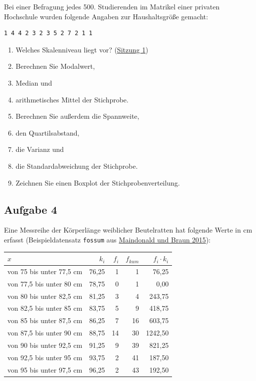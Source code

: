\documentclass[
  11pt,
  ngerman,
  a4paper,
]{report}
\providecommand{\tightlist}{%
  \setlength{\itemsep}{0pt}\setlength{\parskip}{0pt}}
\begin{document}
Bei einer Befragung jedes 500. Studierenden im Matrikel einer privaten Hochschule wurden folgende Angaben zur Haushaltsgröße gemacht:

\begin{verbatim}
1 4 4 2 3 2 3 5 2 7 2 1 1
\end{verbatim}

\begin{enumerate}
\def\labelenumi{\alph{enumi})}
\tightlist
\item
  Welches Skalenniveau liegt vor? (\protect\hyperlink{skalenniveaus}{Sitzung 1})
\item
  Berechnen Sie Modalwert,
\item
  Median und
\item
  arithmetisches Mittel der Stichprobe.
\item
  Berechnen Sie außerdem die Spannweite,
\item
  den Quartilsabstand,
\item
  die Varianz und
\item
  die Standardabweichung der Stichprobe.
\item
  Zeichnen Sie einen Boxplot der Stichprobenverteilung.
\end{enumerate}

\hypertarget{aufgabe-4-1}{%
\subsection{Aufgabe 4}\label{aufgabe-4-1}}

Eine Messreihe der Körperlänge weiblicher Beutelratten hat folgende Werte in cm erfasst (Beispieldatensatz \texttt{fossum} aus \protect\hyperlink{ref-daag}{Maindonald und Braun 2015}):

\begin{table}[H]
\centering
\begin{tabular}{lrrrr}
\toprule
$x$ & $k_i$ & $f_i$ & $f_{kum}$ & $f_i \cdot k_i$\\
\midrule
von 75 bis unter 77,5 cm & 76,25 & 1 & 1 & 76,25\\
von 77,5 bis unter 80 cm & 78,75 & 0 & 1 & 0,00\\
von 80 bis unter 82,5 cm & 81,25 & 3 & 4 & 243,75\\
von 82,5 bis unter 85 cm & 83,75 & 5 & 9 & 418,75\\
von 85 bis unter 87,5 cm & 86,25 & 7 & 16 & 603,75\\
von 87,5 bis unter 90 cm & 88,75 & 14 & 30 & 1242,50\\
von 90 bis unter 92,5 cm & 91,25 & 9 & 39 & 821,25\\
von 92,5 bis unter 95 cm & 93,75 & 2 & 41 & 187,50\\
von 95 bis unter 97,5 cm & 96,25 & 2 & 43 & 192,50\\
\bottomrule
\end{tabular}
\end{table}
\end{document}
